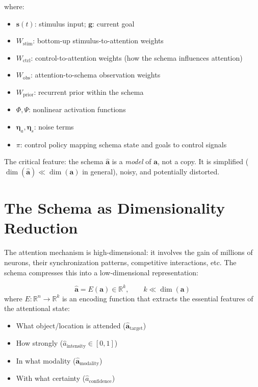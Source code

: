 \documentclass[11pt,a4paper]{report}
\begin{document}
where:
\begin{itemize}[leftmargin=1.5em]
  \item $\mathbf{s}(t)$: stimulus input; $\mathbf{g}$: current goal
  \item $W_{\text{stim}}$: bottom-up stimulus-to-attention weights
  \item $W_{\text{ctrl}}$: control-to-attention weights (how the schema influences attention)
  \item $W_{\text{obs}}$: attention-to-schema observation weights
  \item $W_{\text{prior}}$: recurrent prior within the schema
  \item $\Phi, \Psi$: nonlinear activation functions
  \item $\boldsymbol{\eta}_a, \boldsymbol{\eta}_s$: noise terms
  \item $\pi$: control policy mapping schema state and goals to control signals
\end{itemize}

The critical feature: the schema $\hat{\mathbf{a}}$ is a \emph{model} of $\mathbf{a}$, not a copy. It is simplified ($\dim(\hat{\mathbf{a}}) \ll \dim(\mathbf{a})$ in general), noisy, and potentially distorted.

\section{The Schema as Dimensionality Reduction}

The attention mechanism is high-dimensional: it involves the gain of millions of neurons, their synchronization patterns, competitive interactions, etc. The schema compresses this into a low-dimensional representation:

\begin{mathbox}
\vspace{-8pt}
\[
  \hat{\mathbf{a}} = E(\mathbf{a}) \in \mathbb{R}^k, \qquad k \ll \dim(\mathbf{a})
\]
where $E : \mathbb{R}^n \to \mathbb{R}^k$ is an encoding function that extracts the essential features of the attentional state:
\begin{itemize}[leftmargin=1.5em]
  \item What object/location is attended ($\hat{\mathbf{a}}_{\text{target}}$)
  \item How strongly ($\hat{a}_{\text{intensity}} \in [0,1]$)
  \item In what modality ($\hat{\mathbf{a}}_{\text{modality}}$)
  \item With what certainty ($\hat{a}_{\text{confidence}}$)
\end{itemize}
\vspace{-6pt}
\end{mathbox}
\end{document}
